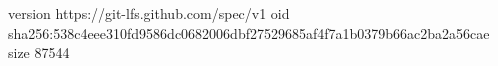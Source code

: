 version https://git-lfs.github.com/spec/v1
oid sha256:538c4eee310fd9586dc0682006dbf27529685af4f7a1b0379b66ac2ba2a56cae
size 87544
